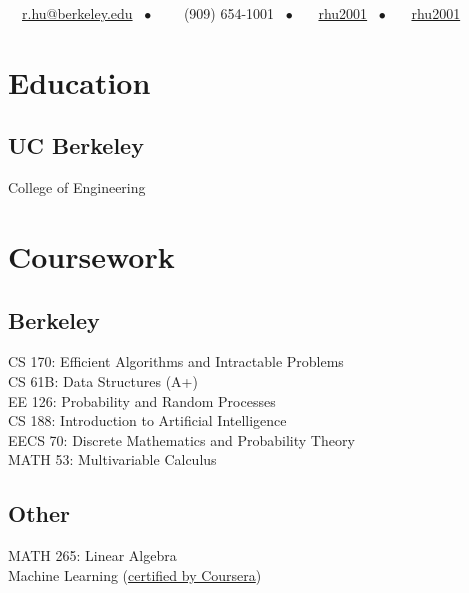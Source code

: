 \documentclass[]{deedy-resume-openfont}
\begin{document}
%
%
{\faEnvelope \ \ \href{mailto:r.hu@berkeley.edu}{r.hu@berkeley.edu} \ \(\bullet\) \ \ \faPhone \ \ (909)  654-1001 \ \(\bullet\) \ \faGithub \ \ \href{https://github.com/rhu2001}{rhu2001} \ \(\bullet\) \ \faLinkedin \ \ \href{https://www.linkedin.com/in/rhu2001/}{rhu2001}}

%
%

\begin{minipage}[t]{0.33\textwidth} 


\section{Education} 

\subsection{UC Berkeley}
College of Engineering \\


\section{Coursework}

\subsection{Berkeley}
CS 170: Efficient Algorithms and Intractable Problems \\
CS 61B: Data Structures (A+) \\
EE 126: Probability and Random Processes \\
CS 188: Introduction to Artificial Intelligence \\
EECS 70: Discrete Mathematics and Probability Theory \\
MATH 53: Multivariable Calculus \\
\subsection{Other}
MATH 265: Linear Algebra \\
Machine Learning (\href{https://coursera.org/share/f28a9bb54a4cca7c445539ba73aa3d48}{certified by Coursera})


\end{minipage}
\end{document}
